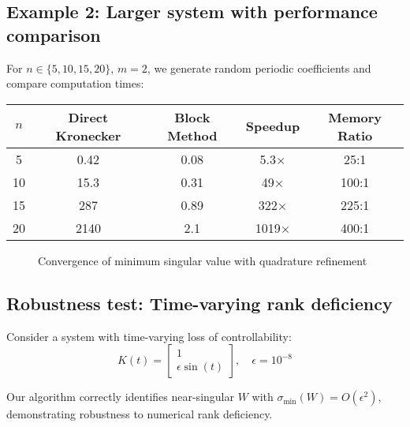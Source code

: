 \documentclass[5p,times]{elsarticle} %
\begin{document}
\subsection{Example 2: Larger system with performance comparison}
For \(n\in\{5,10,15,20\}\), \(m=2\), we generate random periodic coefficients and compare computation times:
\begin{table}[h]
\centering
\small
\setlength{\tabcolsep}{6pt}
\hspace*{-0.6cm} %
\begin{tabular}{@{}ccccc@{}}
\toprule
\(n\) & Direct Kronecker & Block Method & Speedup & Memory Ratio \\
\midrule
5   & 0.42  & 0.08  & 5.3×   & 25:1 \\
10  & 15.3  & 0.31  & 49×    & 100:1 \\
15  & 287   & 0.89  & 322×   & 225:1 \\
20  & 2140  & 2.1   & 1019×  & 400:1 \\
\bottomrule
\end{tabular}
\end{table}

\begin{figure}[H]
\centering
{}
\caption{Convergence of minimum singular value with quadrature refinement}
\label{fig:convergence}
\end{figure}

\subsection{Robustness test: Time-varying rank deficiency}
Consider a system with time-varying loss of controllability:
\[
K(t) = \begin{bmatrix} 1 \\ \epsilon\sin(t) \end{bmatrix}, \quad \epsilon = 10^{-8}
\]
\begin{sloppypar}
Our algorithm correctly identifies near-singular \(W\) with \(\sigma_{\min}(W) = O(\epsilon^2)\), demonstrating robustness to numerical rank deficiency.
\end{sloppypar}
\end{document}
